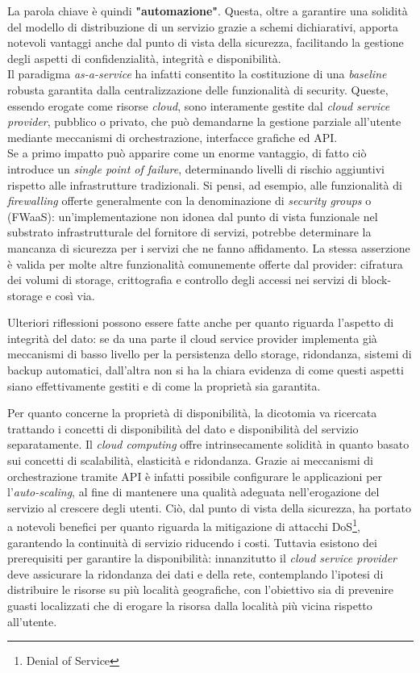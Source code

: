 \documentclass[../main.tex]{subfiles}
\begin{document}
La parola chiave è quindi \textbf{"automazione"}. Questa, oltre a garantire una solidità del modello di distribuzione di un servizio grazie a schemi dichiarativi, apporta notevoli vantaggi anche dal punto di vista della sicurezza, facilitando la gestione degli aspetti di confidenzialità, integrità e disponibilità.
\\Il paradigma \textit{as-a-service} ha infatti consentito la costituzione di una \textit{baseline} robusta garantita dalla centralizzazione delle funzionalità di security.
Queste, essendo erogate come risorse \textit{cloud}, sono interamente gestite dal \textit{cloud service provider}, pubblico o privato, che può demandarne la gestione parziale all'utente mediante meccanismi di orchestrazione, interfacce grafiche ed API.
\\Se a primo impatto può apparire come un enorme vantaggio, di fatto ciò introduce un \textit{single point of failure}, determinando livelli di rischio aggiuntivi rispetto alle infrastrutture tradizionali. Si pensi, ad esempio, alle funzionalità di \textit{firewalling} offerte generalmente con la denominazione di \textit{security groups} o  (FWaaS): un'implementazione non idonea dal punto di vista funzionale nel substrato infrastrutturale del fornitore di servizi, potrebbe determinare la mancanza di sicurezza per i servizi che ne fanno affidamento.
La stessa asserzione è valida per molte altre funzionalità comunemente offerte dal provider: cifratura dei volumi di storage, crittografia e controllo degli accessi nei servizi di block-storage e così via.


Ulteriori riflessioni possono essere fatte anche per quanto riguarda l'aspetto di integrità del dato: se da una parte il cloud service provider implementa già meccanismi di basso livello per la persistenza dello storage, ridondanza, sistemi di backup automatici, dall'altra non si ha la chiara evidenza di come questi aspetti siano effettivamente gestiti e di come la proprietà sia garantita.


Per quanto concerne la proprietà di disponibilità, la dicotomia va ricercata trattando i concetti di disponibilità del dato e disponibilità del servizio separatamente.
Il \textit{cloud computing} offre intrinsecamente solidità in quanto basato sui concetti di scalabilità, elasticità e ridondanza. Grazie ai meccanismi di orchestrazione tramite API è infatti possibile configurare le applicazioni per l'\textit{auto-scaling}, al fine di mantenere una qualità adeguata nell'erogazione del servizio al crescere degli utenti. Ciò, dal punto di vista della sicurezza, ha portato a notevoli benefici per quanto riguarda la mitigazione di attacchi DoS\footnote{Denial of Service}, garantendo la continuità di servizio riducendo i costi.
Tuttavia esistono dei prerequisiti per garantire la disponibilità: innanzitutto il \textit{cloud service provider} deve assicurare la ridondanza dei dati e della rete, contemplando l'ipotesi di distribuire le risorse su più località geografiche, con l'obiettivo sia di prevenire guasti localizzati che di erogare la risorsa dalla località più vicina rispetto all'utente.
\end{document}
